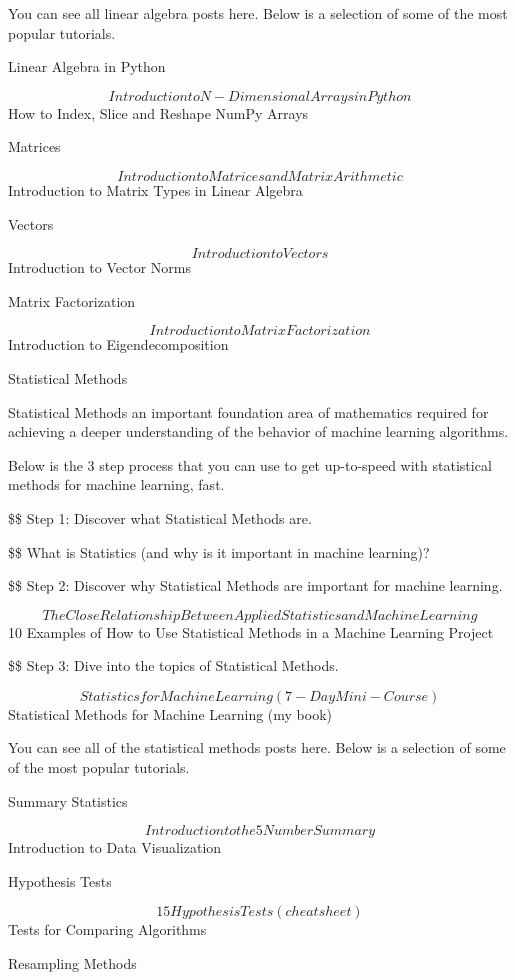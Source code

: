 \documentclass[11pt]{article}
\begin{document}
You can see all linear algebra posts here. Below is a selection of some of the most popular tutorials.

Linear Algebra in Python

$$ Introduction to N-Dimensional Arrays in Python
$$ How to Index, Slice and Reshape NumPy Arrays

Matrices

$$ Introduction to Matrices and Matrix Arithmetic
$$ Introduction to Matrix Types in Linear Algebra

Vectors

$$ Introduction to Vectors
$$ Introduction to Vector Norms

Matrix Factorization

$$ Introduction to Matrix Factorization
$$ Introduction to Eigendecomposition

Statistical Methods

Statistical Methods an important foundation area of mathematics required for achieving a deeper understanding of the behavior of machine learning algorithms.

Below is the 3 step process that you can use to get up-to-speed with statistical methods for machine learning, fast.

\$\$ Step 1: Discover what Statistical Methods are. 

\$\$ What is Statistics (and why is it important in machine learning)?

\$\$ Step 2: Discover why Statistical Methods are important for machine learning. 

$$  The Close Relationship Between Applied Statistics and Machine Learning
 $$  10 Examples of How to Use Statistical Methods in a Machine Learning Project

\$\$ Step 3: Dive into the topics of Statistical Methods. 

$$ Statistics for Machine Learning (7-Day Mini-Course)
 $$ Statistical Methods for Machine Learning (my book)

You can see all of the statistical methods posts here. Below is a selection of some of the most popular tutorials.

Summary Statistics

$$ Introduction to the 5 Number Summary
$$ Introduction to Data Visualization

Hypothesis Tests

$$ 15 Hypothesis Tests (cheat sheet)
$$ Tests for Comparing Algorithms

Resampling Methods
\end{document}
